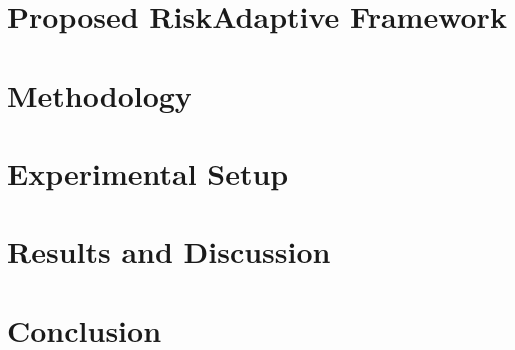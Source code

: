 \documentclass[conference]{IEEEtran}
\begin{document}
\section{Proposed RiskAdaptive Framework}


\section{Methodology}


\section{Experimental Setup}


\section{Results and Discussion}


\section{Conclusion}




\end{document}
